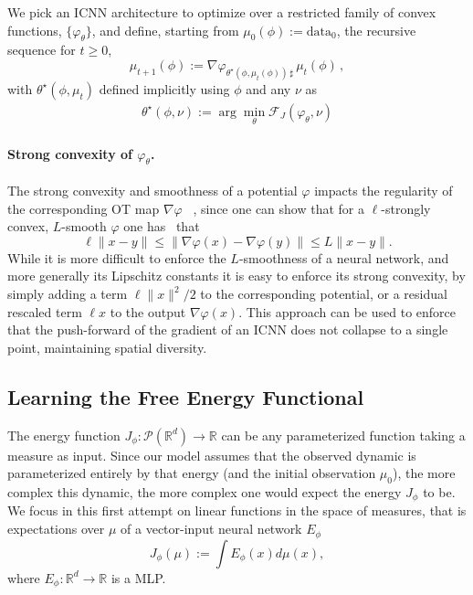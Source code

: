 We pick an ICNN architecture to optimize over a restricted family of convex functions, $\{\varphi_{\theta}\}$, and define, starting from $\mu_0(\phi):=\mathrm{data}_0$, the recursive sequence for $t\geq 0$,
\begin{equation} \label{eq:next_pop}
\mu_{t+1}(\phi) := \nabla \varphi_{\theta^\star\!(\phi, \mu_t(\phi))\, \sharp}\, \mu_{t}(\phi)\,,
\end{equation}
with $\theta^\star(\phi, \mu_t)$ defined implicitly using $\phi$ and any $\nu$ as 
\begin{align} \label{eq:thetastar}
    \theta^\star(\phi, \nu):=\arg \min_{\theta} \mathcal{F}_J(\varphi_{\theta},\nu)
\end{align}

\paragraph{Strong convexity of $\varphi_\theta$.} The strong convexity and smoothness of a potential $\varphi$ impacts the regularity of the corresponding OT map $\nabla\varphi$ ~\citep{caffarelli2000monotonicity,figalli2010optimal}, since one can show that for a $\ell$-strongly convex, $L$-smooth $\varphi$ one has~\citep{paty2020regularity} that
$$
\ell \|x - y\| \leq \|\nabla\varphi(x) -\nabla\varphi(y)\|  \leq L\|x - y\|.
$$
While it is more difficult to enforce the $L$-smoothness of a neural network, and more generally its Lipschitz constants \citep{scaman2018lipschitz} it is easy to enforce its strong convexity, by simply adding a term $\ell \|x\|^2/2$ to the corresponding potential, or a residual rescaled term $\ell x$ to the output $\nabla\varphi(x)$. This approach can be used to enforce that the push-forward of the gradient of an ICNN does not collapse to a single point, maintaining spatial diversity.

\subsection{Learning the Free Energy Functional}  \label{sec:learn_energy}
The energy function $J_\phi : \mathcal{P}(\mathbb{R}^d) \rightarrow \mathbb{R}$ can be any parameterized function taking a measure as input. 
Since our model assumes that the observed dynamic is parameterized entirely by that energy (and the initial observation $\mu_0$), the more complex this dynamic, the more complex one would expect the energy $J_\phi$ to be. We focus in this first attempt on linear functions in the space of measures, that is expectations over $\mu$ of a vector-input neural network $E_\phi$
\begin{equation} \label{eq:energy}
    J_\phi(\mu) := \int E_\phi(x) d\mu(x),
\end{equation}
where $E_\phi:\mathbb{R}^d \rightarrow \mathbb{R}$ is a \acrfull{MLP}.


